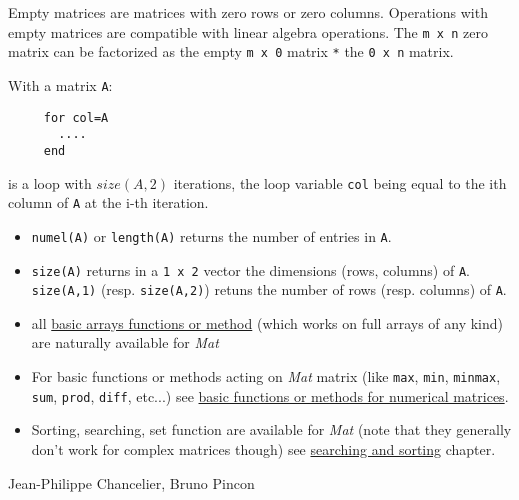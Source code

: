 
Empty matrices are matrices with zero rows or zero columns. Operations with empty matrices
are compatible with linear algebra operations. The \verb+m x n+ zero matrix can be 
factorized as the empty \verb+m x 0+ matrix \verb+*+ the \verb+0 x n+ matrix. 


With a matrix \verb+A+:
\begin{verbatim}
     for col=A
       ....
     end
\end{verbatim} 
is a loop with $size(A,2)$ iterations, the loop 
variable  \verb+col+ being equal to the ith column of \verb+A+ at the i-th iteration.

\begin{itemize}
   \item \verb+numel(A)+ or \verb+length(A)+ returns the number of entries in \verb+A+.
   \item \verb+size(A)+ returns in a \verb+1 x 2+ vector the dimensions (rows, columns)
of \verb+A+. \verb+size(A,1)+ (resp. \verb+size(A,2)+) retuns the number of rows 
(resp. columns) of \verb+A+.
   \item all \hyperlink{arrays}{basic arrays functions or method} (which works on full arrays of any kind) 
     are naturally available for \emph{Mat} 
   \item For basic functions or methods acting on \emph{Mat} matrix (like \verb+max+, \verb+min+, \verb+minmax+,
     \verb+sum+, \verb+prod+, \verb+diff+, etc...) see \hyperlink{basicnumarrays}{basic functions or methods for numerical matrices}.
    \item Sorting, searching, set function are available for \emph{Mat}  (note that they generally don't work for complex matrices
      though) see \hyperlink{searchandsort}{searching and sorting} chapter.
\end{itemize}


\begin{manseealso}

\end{manseealso}

\begin{authors}
   Jean-Philippe Chancelier, Bruno Pincon
\end{authors}
